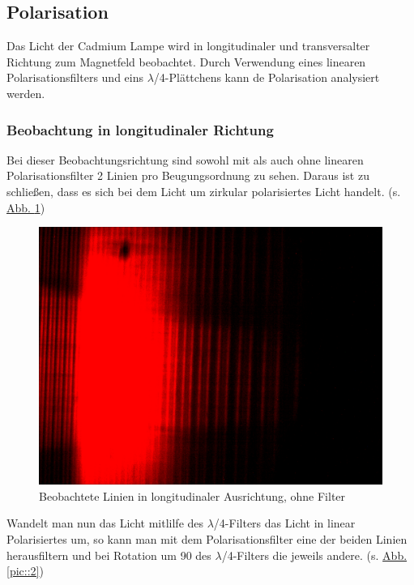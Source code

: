   \subsection{Polarisation}
    Das Licht der Cadmium Lampe wird in longitudinaler und transversalter Richtung zum Magnetfeld beobachtet. Durch Verwendung eines linearen Polarisationsfilters und eins $\lambda$/4-Plättchens kann de Polarisation analysiert werden.

    \subsubsection{Beobachtung in longitudinaler Richtung}
      Bei dieser Beobachtungsrichtung sind sowohl mit als auch ohne linearen Polarisationsfilter 2 Linien pro Beugungsordnung zu sehen. Daraus ist zu schließen, dass es sich bei dem Licht um zirkular polarisiertes Licht handelt. (s. \hyperref[pic::1]{Abb. \ref*{pic::1}})

      \begin{figure}[H]
        \centering
        \includegraphics[width=.6\paperwidth, trim={0 200pt 0 400pt}, clip]{Auswertung/data/long/10A_0}
        \caption{Beobachtete Linien in longitudinaler Ausrichtung, ohne Filter}
        \label{pic::1}
      \end{figure}

      Wandelt man nun das Licht mitlilfe des $\lambda$/4-Filters das Licht in linear Polarisiertes um, so kann man mit dem Polarisationsfilter eine der beiden Linien herausfiltern und bei Rotation um \SI{90}{\deg} des $\lambda$/4-Filters die jeweils andere. (s. \hyperref[pic::2]{Abb. \ref*{pic::2}})

